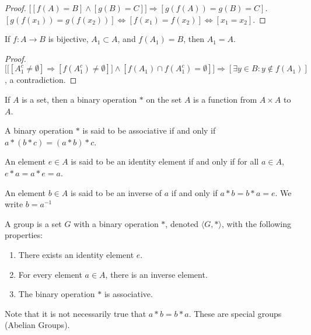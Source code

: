 \documentclass[crop=false,class=book,oneside]{standalone}
\begin{document}
        \begin{proof}
        $\big[[f(A) = B]\land [g(B) = C]\big]\Rightarrow [g(f(A)) = g(B) = C]$. $[g(f(x_1))=g(f(x_2))]\Leftrightarrow [f(x_1)=f(x_2)]\Leftrightarrow [x_1=x_2]$.
        \end{proof}
        \begin{theorem}
        If $f:A\rightarrow B$ is bijective, $A_1\subset A$, and $f(A_1) = B$, then $A_1=A$.
        \end{theorem}
        \begin{proof}
        $\Big[\big[[A_1^c \ne \emptyset]\Rightarrow [f(A_1^c) \ne \emptyset]\big]\land[f(A_1)\cap f(A_1^c) = \emptyset]\Big]\Rightarrow [\exists y\in B:y\notin f(A_1)]$, a contradiction.
        \end{proof}
        \begin{definition}
        If $A$ is a set, then a binary operation $*$ on the set $A$ is a function from $A\times A$ to $A$.
        \end{definition}
        \begin{definition}
        A binary operation $*$ is said to be associative if and only if $a*(b*c) = (a*b)*c$.
        \end{definition}
        \begin{definition}
        An element $e\in A$ is said to be an identity element if and only if for all $a\in A$, $e*a = a*e = a$.
        \end{definition}
        \begin{definition}
        An element $b\in A$ is said to be an inverse of $a$ if and only if $a*b=b*a = e$. We write $b=a^{-1}$
        \end{definition}
        \begin{definition}[Group]
        A group is a set $G$ with a binary operation $*$, denoted $\langle G,* \rangle$, with the following properties: 
        \begin{enumerate}
        \item There exists an identity element $e$.
        \item For every element $a\in A$, there is an inverse element.
        \item The binary operation $*$ is associative.
        \end{enumerate}
        \end{definition}
        \begin{remark}
        Note that it is not necessarily true that $a*b = b*a$. These are special groups (Abelian Groups).
        \end{remark}
\end{document}
